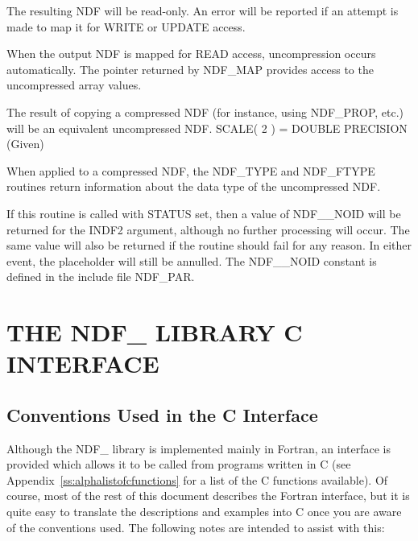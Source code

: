 \documentclass[twoside,11pt,nolof]{starlink}
\begin{document}
{{{         \sstitem
         The resulting NDF will be read-only. An error will be reported if
         an attempt is made to map it for WRITE or UPDATE access.

         \sstitem
         When the output NDF is mapped for READ access, uncompression occurs
         automatically. The pointer returned by NDF\_MAP provides access to the
         uncompressed array values.

         \sstitem
         The result of copying a compressed NDF (for instance, using
         NDF\_PROP, etc.) will be an equivalent uncompressed NDF.
         SCALE( 2 ) = DOUBLE PRECISION (Given)

         \sstitem
         When applied to a compressed NDF, the NDF\_TYPE and NDF\_FTYPE
         routines return information about the data type of the uncompressed
         NDF.

         \sstitem
         If this routine is called with STATUS set, then a value of
         NDF\_\_NOID will be returned for the INDF2 argument, although no
         further processing will occur. The same value will also be
         returned if the routine should fail for any reason. In either
         event, the placeholder will still be annulled. The NDF\_\_NOID
         constant is defined in the include file NDF\_PAR.
      }
   }
}

\normalsize

\newpage
\section{\label{ss:cinterface}THE NDF\_ LIBRARY C INTERFACE}

\subsection{Conventions Used in the C Interface}

Although the NDF\_ library is implemented mainly in Fortran, an
interface is provided which allows it to be called from programs
written in C (see Appendix~\ref{ss:alphalistofcfunctions} for a list
of the C functions available). Of course, most of the rest of this
document describes the Fortran interface, but it is quite easy to
translate the descriptions and examples into C once you are aware of
the conventions used. The following notes are intended to assist with
this:
\end{document}
